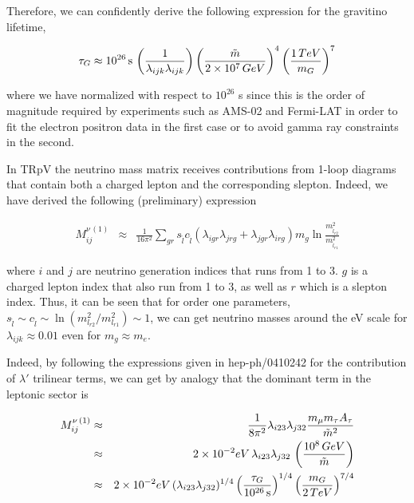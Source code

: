 \documentclass[a4paper,11pt]{article}
\begin{document}
Therefore, we can confidently derive the following expression for
the gravitino lifetime,

\begin{equation}
\tau_{G} \approx 10^{26}\,\text{s}\,\left(\frac{1}{\lambda_{ijk}\lambda_{ijk}}\right)\left(\frac{\tilde{m}}{2\times 10^{7}\mbox{\,GeV}}\right)^{4}\left(\frac{1\,\mbox{TeV}}{m_{G}}\right)^{7}\label{eq:GravLifeTime}
\end{equation}


\noindent where we have normalized with respect to $10^{26}$ s
since this is the order of magnitude required by experiments such
as AMS-02 and Fermi-LAT in order to fit the electron positron data
in the first case or to avoid gamma ray constraints in the second.



In TRpV the neutrino mass matrix receives contributions from
1-loop diagrams that contain both a charged lepton and the corresponding
slepton. Indeed, we have derived the following (preliminary) expression

\begin{eqnarray*}
M_{ij}^{\nu\,(1)} & \approx & \frac{1}{16\pi^{2}}\sum_{gr}s_{\tilde{l}}c_{\tilde{l}}(\lambda_{igr}\lambda_{jrg}+\lambda_{jgr}\lambda_{irg})m_{g}\ln\frac{m_{\tilde{l}_{r2}}^{2}}{m_{\tilde{l}_{r1}}^{2}}
\end{eqnarray*}


\noindent where $i$ and $j$ are neutrino generation indices that
runs from 1 to 3. $g$ is a charged lepton index that also run from
1 to 3, as well as $r$ which is a slepton index. Thus, it can be
seen that for order one parameters, $s_{\tilde{l}} \sim c_{\tilde{l}} \sim \ln(m_{l_{r2}}^{2}/m_{l_{r1}}^{2})\sim 1$, we can get neutrino masses around the eV scale for $\lambda_{ijk}\approx0.01$
even for $m_{g}\approx m_{e}$. 


Indeed, by following the expressions given in hep-ph/0410242 for the
contribution of $\lambda'$ trilinear terms, we can get by analogy
that the dominant term in the leptonic sector is 

\begin{eqnarray*}
M_{ij}^{\nu\,(1)} & \approx & \frac{1}{8\pi^{2}}\lambda_{i23}\lambda_{j32}\frac{m_{\mu}m_{\tau}A_{\tau}}{\tilde{m}^{2}}\\
 & \approx & 2\times10^{-2}\mbox{eV}\,\lambda_{i23}\lambda_{j32}\,\left(\frac{10^{8}\mbox{\,GeV}}{\tilde{m}}\right)\\
 & \approx & 2 \times10^{-2}\mbox{eV}\,(\lambda_{i23}\lambda_{j32})^{1/4}\left(\frac{\tau_{G}}{10^{\text{26}}\,\text{s}}\right)^{1/4}\left(\frac{m_{G}}{2\,\mbox{TeV}}\right)^{7/4}
\end{eqnarray*}
\end{document}
